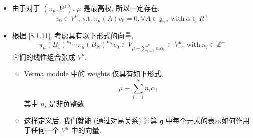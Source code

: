 \begin{itemize}
	\item 由于对于 $(\pi_\mu, V^\mu)$, $\mu$ 是最高权, 所以一定存在,
	\begin{equation}
		v_0 \in V^\mu, \ \text{s.t.} \ \pi_\mu(A) v_0 = 0, \forall A \in \mathfrak{g}_\alpha, \ \text{with} \ \alpha \in R^+
	\end{equation}
	
	\item 根据 \eqref{8.1.11}, 考虑具有以下形式的向量,
	\begin{equation}
		\pi_\mu(B_1)^{n_1} \cdots \pi_\mu(B_N)^{n_N} v_0 \in V_{\mu - \sum_{i = 1}^N n_i \alpha_i} \subset V^\mu, \ \text{with} \ n_i \in \mathbb{Z}^+
	\end{equation}
	它们的线性组合张成 $V^\mu$.
	\begin{itemize}
		\item Verma module 中的 weights 仅具有如下形式,
		\begin{equation}
			\mu - \sum_{i = 1}^N n_i \alpha_i
		\end{equation}
		其中 $n_i$ 是非负整数.
		
		\item 这样定义后, 我们就能 (通过对易关系) 计算 $\mathfrak{g}$ 中每个元素的表示如何作用于任何一个 $V^\mu$ 中的向量.
	\end{itemize}
\end{itemize}

